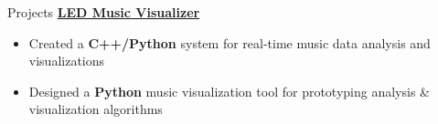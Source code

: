 \documentclass{resume/resume}
\begin{document}
\begin{rSection}{Projects}
    \href{https://www.linkedin.com/feed/update/urn:li:activity:6603722406240628736/}{\bf LED Music Visualizer}
    \vspace{-6pt}
    \begin{itemize}[nosep]
      \item Created a {\bf C++/Python} system for real-time music data analysis and visualizations
      \item Designed a {\bf Python} music visualization tool for prototyping analysis \& visualization algorithms
    \end{itemize}

    

\end{rSection}
\end{document}
